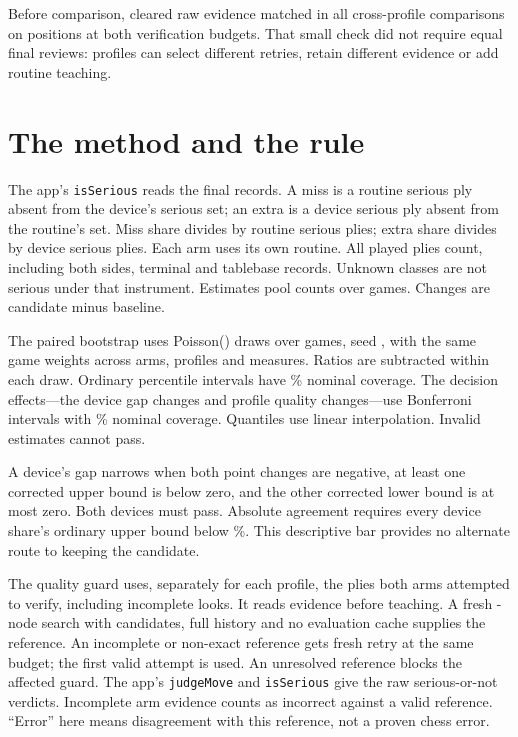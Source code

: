 \documentclass[11pt]{article}
\begin{document}
Before comparison, cleared raw evidence matched in all
\DeterminismComparisons{} cross-profile comparisons on
\DeterminismPositions{} positions at both verification budgets.
That small check did not require equal final reviews: profiles can select
different retries, retain different evidence or add routine teaching.

\section{The method and the rule}
The app's \texttt{isSerious} reads the final records. A miss is a routine
serious ply absent from the device's serious set; an extra is a device serious
ply absent from the routine's set. Miss share divides by routine serious
plies; extra share divides by device serious plies. Each arm uses its own
routine. All played plies count, including both sides, terminal and tablebase
records. Unknown classes are not serious under that instrument. Estimates
pool counts over games. Changes are candidate minus baseline.

The paired bootstrap uses \Draws{} Poisson(\PoissonMean) draws over games,
seed \Seed, with the same game weights across arms, profiles and measures.
Ratios are subtracted within each draw. Ordinary percentile intervals have
\Confidence\% nominal coverage. The \Effects{} decision effects---the device
gap changes and profile quality changes---use Bonferroni intervals with
\CorrectedConfidence\% nominal coverage. Quantiles use linear interpolation.
Invalid estimates cannot pass.

A device's gap narrows when both point changes are negative, at least one
corrected upper bound is below zero, and the other corrected lower bound is
at most zero. Both devices must pass. Absolute agreement
requires every device share's ordinary upper bound below \AgreementLine\%.
This descriptive bar provides no alternate route to keeping the candidate.

The quality guard uses, separately for each profile, the plies both arms
attempted to verify, including incomplete looks. It reads evidence before
teaching. A fresh \ReferenceNodes-node search with \Candidates{} candidates,
full history and no evaluation cache supplies the reference. An incomplete
or non-exact reference gets \ReferenceRetries{} fresh retry at the same
budget; the first valid attempt is used. An unresolved reference blocks the
affected guard. The app's \texttt{judgeMove} and \texttt{isSerious} give the
raw serious-or-not verdicts. Incomplete arm evidence counts as incorrect
against a valid reference. ``Error'' here means disagreement with this
reference, not a proven chess error.
\end{document}
